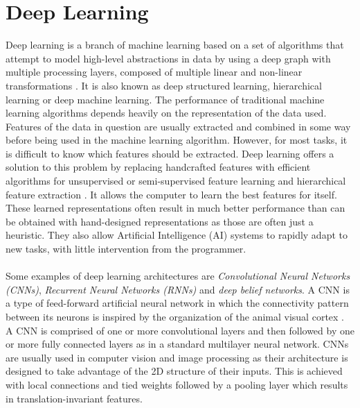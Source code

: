 \section{Deep Learning}
Deep learning is a branch of machine learning based on a set of algorithms that attempt to model high-level abstractions in data by using a deep graph with multiple processing layers, composed of multiple linear and non-linear transformations \cite{REF33}. It is also known as deep structured learning, hierarchical learning or deep machine learning. The performance of traditional machine learning algorithms depends heavily on the representation of the data used. Features of the data in question are usually extracted and combined in some way before being used in the machine learning algorithm. However, for most tasks, it is difficult to know which features should be extracted. Deep learning offers a solution to this problem by replacing handcrafted features with efficient algorithms for unsupervised or semi-supervised feature learning and hierarchical feature extraction \cite{REF34}. It allows the computer to learn the best features for itself. These learned representations often result in much better performance than can be obtained with hand-designed representations as those are often just a heuristic. They also allow Artificial Intelligence (AI) systems to rapidly adapt to new tasks, with little intervention from the programmer.\\ \\
%
Some examples of deep learning architectures are \textit{Convolutional Neural Networks (CNNs)}, \textit{Recurrent Neural Networks (RNNs)} and \textit{deep belief networks}. A CNN is a type of feed-forward artificial neural network in which the connectivity pattern between its neurons is inspired by the organization of the animal visual cortex \cite{REF35}. A CNN is comprised of one or more convolutional layers and then followed by one or more fully connected layers as in a standard multilayer neural network. CNNs are usually used in computer vision and image processing as their architecture is designed to take advantage of the 2D structure of their inputs. This is achieved with local connections and tied weights followed by a pooling layer which results in translation-invariant features.\\ \\ 
%
